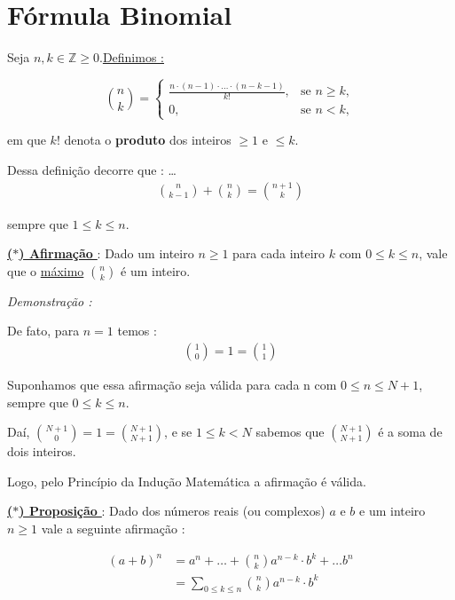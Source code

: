 \section*{Fórmula Binomial}

Seja $n,k \in \mathbb{Z} \ge 0$.\underline{Definimos :}

\begin{equation*}
    \binom{n}{k} = \begin{cases}\displaystyle
        \frac{n \cdot (n-1) \cdot \dotsc \cdot (n-k-1) }{k!}, & \text{se } n \ge k,\\[6pt] 
        0, & \text{se } n < k,
    \end{cases}        
\end{equation*}

em que $k!$ denota o \textbf{produto} dos inteiros $\ge 1$ e $\leq k$.

Dessa definição decorre que : 
\dots
\begin{align*}
\binom{n}{k-1} + \binom{n}{k} = \binom{n + 1}{k}
\end{align*}

sempre que $1 \leq k \leq n$.

\noindent\underline{\underline{\textbf{($\ast$) Afirmação }}} : Dado um inteiro $n \ge 1$ para cada inteiro $k$
com $0 \leq k \leq n$, vale que o \underline{máximo} $\binom{n}{k}$ é um inteiro.

\textit{Demonstração : }

De fato, para $n=1$ temos :
\begin{align*}
\binom{1}{0} = 1 = \binom{1}{1}
\end{align*}

Suponhamos que essa afirmação seja válida para cada n com $0 \leq n \leq N+1$, sempre que $0 \leq k \leq n$.

Daí,
$\binom{N+1}{0} = 1 = \binom{N+1}{N+1}$, e se $1 \leq k < N$ sabemos que $\binom{N+1}{N+1}$ é a soma de dois inteiros.

Logo, pelo Princípio da Indução Matemática a afirmação é válida.

\vspace{0.5cm}
\noindent\underline{\underline{\textbf{($\ast$) Proposição }}} : Dado dos números reais (ou complexos) $a$ e $b$ e
um inteiro $n \ge 1$ vale a seguinte afirmação : 

\begin{align*}
    (a+b)^n &= a^n + \dotsc + \binom{n}{k}a^{n-k} \cdot b^{k} + \dotsc b^n\\
    &= \sum_{0 \leq k \leq n}^{} \binom{n}{k}a^{n-k} \cdot b^{k}\\
\end{align*}

